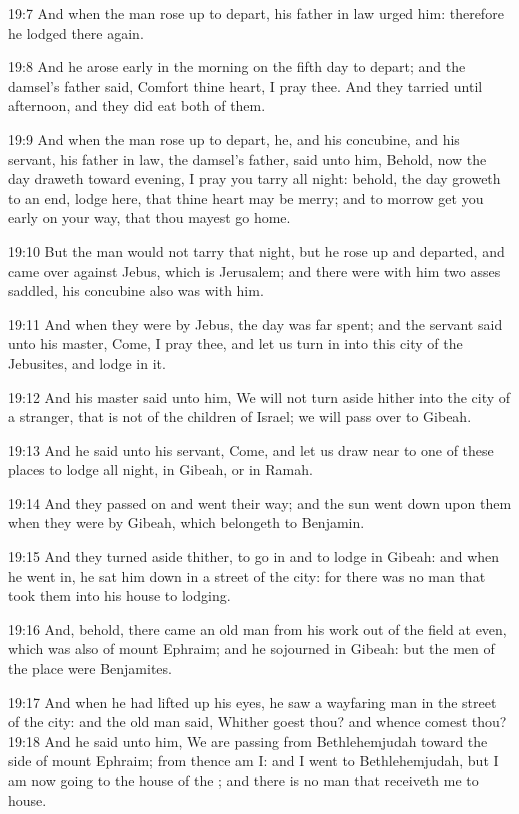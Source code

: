 19:7 And when the man rose up to depart, his father in law urged him:
therefore he lodged there again.

19:8 And he arose early in the morning on the fifth day to depart; and
the damsel's father said, Comfort thine heart, I pray thee. And they
tarried until afternoon, and they did eat both of them.

19:9 And when the man rose up to depart, he, and his concubine, and
his servant, his father in law, the damsel's father, said unto him,
Behold, now the day draweth toward evening, I pray you tarry all
night: behold, the day groweth to an end, lodge here, that thine heart
may be merry; and to morrow get you early on your way, that thou
mayest go home.

19:10 But the man would not tarry that night, but he rose up and
departed, and came over against Jebus, which is Jerusalem; and there
were with him two asses saddled, his concubine also was with him.

19:11 And when they were by Jebus, the day was far spent; and the
servant said unto his master, Come, I pray thee, and let us turn in
into this city of the Jebusites, and lodge in it.

19:12 And his master said unto him, We will not turn aside hither into
the city of a stranger, that is not of the children of Israel; we will
pass over to Gibeah.

19:13 And he said unto his servant, Come, and let us draw near to one
of these places to lodge all night, in Gibeah, or in Ramah.

19:14 And they passed on and went their way; and the sun went down
upon them when they were by Gibeah, which belongeth to Benjamin.

19:15 And they turned aside thither, to go in and to lodge in Gibeah:
and when he went in, he sat him down in a street of the city: for
there was no man that took them into his house to lodging.

19:16 And, behold, there came an old man from his work out of the
field at even, which was also of mount Ephraim; and he sojourned in
Gibeah: but the men of the place were Benjamites.

19:17 And when he had lifted up his eyes, he saw a wayfaring man in
the street of the city: and the old man said, Whither goest thou? and
whence comest thou?  19:18 And he said unto him, We are passing from
Bethlehemjudah toward the side of mount Ephraim; from thence am I: and
I went to Bethlehemjudah, but I am now going to the house of the \LORD;
and there is no man that receiveth me to house.

